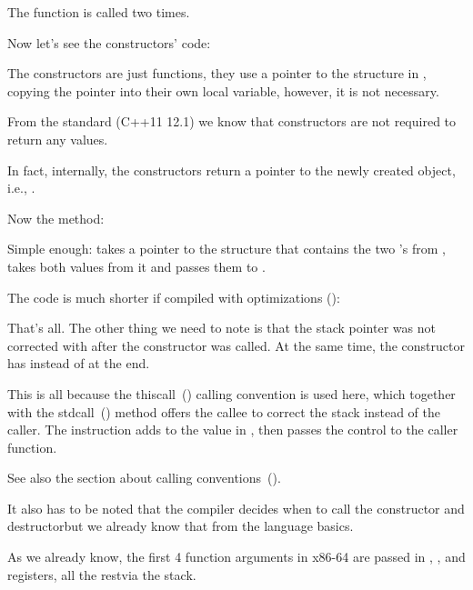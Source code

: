 The  function is called two times.

Now let's see the constructors' code:



The constructors are just functions, they use a pointer to the structure in \ECX,
copying the pointer into their own local variable, however, it is not necessary.

From the \Cpp standard (C++11 12.1) we know that constructors are not required to return any values.

In fact, internally, the constructors return a pointer to the newly created object, i.e., \ITthis.

Now the  method:




Simple enough:  takes a pointer to the structure that contains the two \Tint's from \ECX,
takes both values from it and passes them to \printf.

The code is much shorter if compiled with optimizations (\Ox):




That's all. The other thing we need to note is that the \gls{stack pointer} was not corrected
with  after the constructor was called. 
At the same time, the constructor has  instead of \RET at the end.


This is all because the thiscall~() calling convention is used here,
which together with the stdcall~() method offers the \gls{callee} to correct the stack
instead of the \gls{caller}.
The  instruction adds  to the value in \ESP, then passes the control to the \gls{caller} function.

See also the section about calling conventions~().

It also has to be noted that the compiler decides when to call the constructor and 
destructor\EMDASH{}but we already know that from the \Cpp language basics.

\label{simple_CPP_MSVC_x64}

As we already know, the first 4 function arguments in x86-64 are passed in \RCX, \RDX,  and 
 registers, all the rest\EMDASH{}via the stack.

